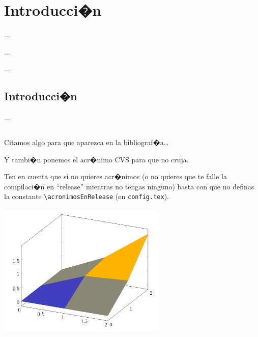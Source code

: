 %
%

\chapter{Introducci�n}

\begin{FraseCelebre}
\begin{Frase}
...
\end{Frase}
\begin{Fuente}
...
\end{Fuente}
\end{FraseCelebre}

\begin{resumen}
...
\end{resumen}


\section{Introducci�n}
\label{cap1:sec:introduccion}

...

\section*{\NotasBibliograficas}
\TocNotasBibliograficas

Citamos algo para que aparezca en la bibliograf�a\ldots
\citep{ldesc2e}

\medskip

Y tambi�n ponemos el acr�nimo \ac{CVS} para que no cruja.

Ten en cuenta que si no quieres acr�nimos (o no quieres que te falle la compilaci�n en ``release'' mientras no tengas ninguno) basta con que no definas la constante \verb+\acronimosEnRelease+ (en \texttt{config.tex}).

\begin{chart}
    \centering
    \includegraphics[width=8cm]{Imagenes/Pgfplot3d3}
    \label{cha:chart1}
    \end{chart}
    
